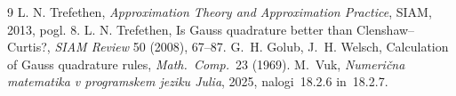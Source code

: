 \documentclass[11pt,a4paper]{article}
\begin{document}
\begin{thebibliography}{9}
 L. N. Trefethen, \emph{Approximation Theory and Approximation
  Practice}, SIAM, 2013, pogl. 8.
 L. N. Trefethen, Is Gauss quadrature better than
  Clenshaw--Curtis?, \emph{SIAM Review} 50 (2008), 67--87.
 G.~H. Golub, J.~H. Welsch, Calculation of Gauss quadrature
  rules, \emph{Math.\ Comp.}\ 23 (1969).
 M.~Vuk, \emph{Numerična matematika v programskem jeziku
  Julia}, 2025, nalogi~18.2.6 in~18.2.7.
\end{thebibliography}
\end{document}
